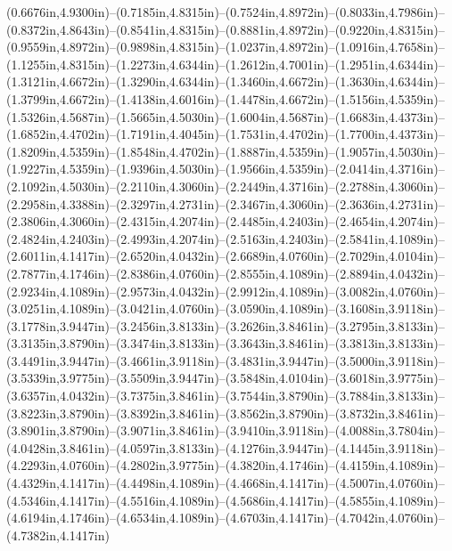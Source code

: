 (0.6676in,4.9300in)--(0.7185in,4.8315in)--(0.7524in,4.8972in)--(0.8033in,4.7986in)--(0.8372in,4.8643in)--(0.8541in,4.8315in)--(0.8881in,4.8972in)--(0.9220in,4.8315in)--(0.9559in,4.8972in)--(0.9898in,4.8315in)--(1.0237in,4.8972in)--(1.0916in,4.7658in)--(1.1255in,4.8315in)--(1.2273in,4.6344in)--(1.2612in,4.7001in)--(1.2951in,4.6344in)--(1.3121in,4.6672in)--(1.3290in,4.6344in)--(1.3460in,4.6672in)--(1.3630in,4.6344in)--(1.3799in,4.6672in)--(1.4138in,4.6016in)--(1.4478in,4.6672in)--(1.5156in,4.5359in)--(1.5326in,4.5687in)--(1.5665in,4.5030in)--(1.6004in,4.5687in)--(1.6683in,4.4373in)--(1.6852in,4.4702in)--(1.7191in,4.4045in)--(1.7531in,4.4702in)--(1.7700in,4.4373in)--(1.8209in,4.5359in)--(1.8548in,4.4702in)--(1.8887in,4.5359in)--(1.9057in,4.5030in)--(1.9227in,4.5359in)--(1.9396in,4.5030in)--(1.9566in,4.5359in)--(2.0414in,4.3716in)--(2.1092in,4.5030in)--(2.2110in,4.3060in)--(2.2449in,4.3716in)--(2.2788in,4.3060in)--(2.2958in,4.3388in)--(2.3297in,4.2731in)--(2.3467in,4.3060in)--(2.3636in,4.2731in)--(2.3806in,4.3060in)--(2.4315in,4.2074in)--(2.4485in,4.2403in)--(2.4654in,4.2074in)--(2.4824in,4.2403in)--(2.4993in,4.2074in)--(2.5163in,4.2403in)--(2.5841in,4.1089in)--(2.6011in,4.1417in)--(2.6520in,4.0432in)--(2.6689in,4.0760in)--(2.7029in,4.0104in)--(2.7877in,4.1746in)--(2.8386in,4.0760in)--(2.8555in,4.1089in)--(2.8894in,4.0432in)--(2.9234in,4.1089in)--(2.9573in,4.0432in)--(2.9912in,4.1089in)--(3.0082in,4.0760in)--(3.0251in,4.1089in)--(3.0421in,4.0760in)--(3.0590in,4.1089in)--(3.1608in,3.9118in)--(3.1778in,3.9447in)--(3.2456in,3.8133in)--(3.2626in,3.8461in)--(3.2795in,3.8133in)--(3.3135in,3.8790in)--(3.3474in,3.8133in)--(3.3643in,3.8461in)--(3.3813in,3.8133in)--(3.4491in,3.9447in)--(3.4661in,3.9118in)--(3.4831in,3.9447in)--(3.5000in,3.9118in)--(3.5339in,3.9775in)--(3.5509in,3.9447in)--(3.5848in,4.0104in)--(3.6018in,3.9775in)--(3.6357in,4.0432in)--(3.7375in,3.8461in)--(3.7544in,3.8790in)--(3.7884in,3.8133in)--(3.8223in,3.8790in)--(3.8392in,3.8461in)--(3.8562in,3.8790in)--(3.8732in,3.8461in)--(3.8901in,3.8790in)--(3.9071in,3.8461in)--(3.9410in,3.9118in)--(4.0088in,3.7804in)--(4.0428in,3.8461in)--(4.0597in,3.8133in)--(4.1276in,3.9447in)--(4.1445in,3.9118in)--(4.2293in,4.0760in)--(4.2802in,3.9775in)--(4.3820in,4.1746in)--(4.4159in,4.1089in)--(4.4329in,4.1417in)--(4.4498in,4.1089in)--(4.4668in,4.1417in)--(4.5007in,4.0760in)--(4.5346in,4.1417in)--(4.5516in,4.1089in)--(4.5686in,4.1417in)--(4.5855in,4.1089in)--(4.6194in,4.1746in)--(4.6534in,4.1089in)--(4.6703in,4.1417in)--(4.7042in,4.0760in)--(4.7382in,4.1417in) 